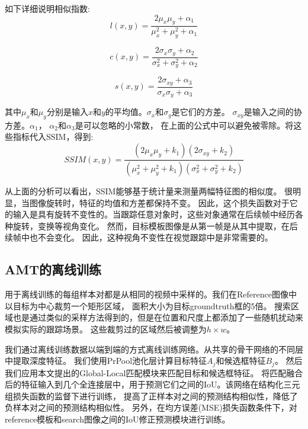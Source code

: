 \documentclass[promaster]{thesis-uestc}
\begin{document}
如下详细说明相似指数:
\begin{equation}
    l(x,y) = \frac{2\mu_{x} \mu_{y} + \alpha_{1}}{\mu_{x}^{2}+\mu_{y}^{2}+ \alpha_{1}} 
    \label{Eq.2}
    \end{equation}
    
    
    \begin{equation}
    c(x,y) = \frac{2\sigma_{x} \sigma_{y} + \alpha_{2}}{\sigma_{x}^{2}+\sigma_{y}^{2}+ \alpha_{2}} 
    \label{Eq.3}
    \end{equation}
    
    \begin{equation}
    s(x,y) = \frac{2\sigma_{xy} + \alpha_{3}}{\sigma_{x} \sigma_{y} + \alpha_{3}} 
    \label{Eq.4}
\end{equation}

其中$\mu_{x}$和$\mu_{y}$分别是输入$x$和$y$的平均值。$\sigma_{x}$和$\sigma_{y}$是它们的方差。
$\sigma_{xy}$是输入之间的协方差。$\alpha_{1}$， $\alpha_{2}$和$\alpha_{3}$是可以忽略的小常数，
在上面的公式中可以避免被零除。将这些指标代入SSIM，得到:
\begin{equation}
    SSIM(x, y) = \frac{(2\mu_{x} \mu_{y} + k_{1})(2\sigma_{xy} + k_{2})}{(\mu_{x}^{2}+\mu_{y}^{2}+ k_{1})(\sigma_{x}^{2}+\sigma_{y}^{2}+ k_{2})} 
    \label{Eq.5}
\end{equation}

从上面的分析可以看出，SSIM能够基于统计量来测量两幅特征图的相似度。
很明显，当图像旋转时，特征的均值和方差都保持不变。
因此，这个损失函数对于它的输入是具有旋转不变性的。当跟踪任意对象时，这些对象通常在后续帧中经历各种旋转，变换等视角变化。
然而，目标模板图像是从第一帧是从其中提取，在后续帧中也不会变化。
因此，这种视角不变性在视觉跟踪中是非常需要的。

\subsection{AMT的离线训练}
用于离线训练的每组样本对都是从相同的视频中采样的。我们在Reference图像中以目标为中心裁剪一个矩形区域，
面积大小为目标groundtruth框的5倍。
搜索区域也是通过类似的采样方法得到的，但是在位置和尺度上都添加了一些随机扰动来模拟实际的跟踪场景。
这些裁剪过的区域然后被调整为$h\times w$。

我们通过离线训练数据以端到端的方式离线训练网络。从共享的骨干网络的不同层中提取深度特征。
我们使用PrPool池化层计算目标特征$A_{j}$和候选框特征$B_{j}$。
然后我们应用本文提出的Global-Local匹配模块来匹配目标和候选框特征。
将匹配融合后的特征输入到几个全连接层中，用于预测它们之间的IoU。该网络在结构化三元组损失函数的监督下进行训练，
提高了正样本对之间的预测结构相似性，降低了负样本对之间的预测结构相似性。
另外，在均方误差(MSE)损失函数条件下，对reference模板和search图像之间的IoU修正预测模块进行训练。
\end{document}
